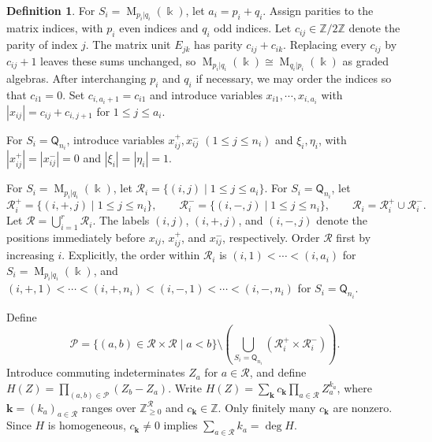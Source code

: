 \documentclass[11pt,reqno]{amsart}
\newcommand{\kk}{\Bbbk}
\newcommand{\Mat}{\operatorname{M}}
\newcommand{\Ztwo}{\mathbb Z/2\mathbb Z}
\newcommand{\Qtype}{\mathsf Q}
\theoremstyle{definition}
\newtheorem{definition}[theorem]{Definition}
\theoremstyle{remark}
\numberwithin{equation}{section}
\begin{document}
\begin{definition}\label{def:separator-data}
For $S_i=\Mat_{p_i|q_i}(\kk)$, let $a_i=p_i+q_i$.
Assign parities to the matrix indices, with $p_i$ even indices
and $q_i$ odd indices. Let $c_{ij}\in\Ztwo$ denote the parity
of index $j$.
The matrix unit $E_{jk}$ has parity $c_{ij}+c_{ik}$.
Replacing every $c_{ij}$ by $c_{ij}+1$ leaves these
sums unchanged, so
$\Mat_{p_i|q_i}(\kk)\cong\Mat_{q_i|p_i}(\kk)$
as graded algebras.
After interchanging $p_i$ and $q_i$ if necessary,
we may order the indices so that $c_{i1}=0$.
Set $c_{i,a_i+1}=c_{i1}$ and introduce variables
$x_{i1},\cdots,x_{i,a_i}$ with
$
|x_{ij}|=c_{ij}+c_{i,j+1}$
for $1\leq j\leq a_i$.

For $S_i=\Qtype_{n_i}$, introduce variables
$x^+_{ij},x^-_{ij}$ $(1\leq j\leq n_i)$ and
$\xi_i,\eta_i$, with
$
|x^+_{ij}|=|x^-_{ij}|=0$ and $
|\xi_i|=|\eta_i|=1$.

For $S_i=\Mat_{p_i|q_i}(\kk)$, let
$\mathcal R_i=\{(i,j)\mid 1\leq j\leq a_i\}$.
For $S_i=\Qtype_{n_i}$, let
\[
\mathcal R_i^+=\{(i,+,j)\mid 1\leq j\leq n_i\},
\qquad
\mathcal R_i^-=\{(i,-,j)\mid 1\leq j\leq n_i\},
\qquad
\mathcal R_i=\mathcal R_i^+\cup\mathcal R_i^-.
\]
Let $\mathcal R=\bigcup_{i=1}^r\mathcal R_i$.
The labels $(i,j)$, $(i,+,j)$, and $(i,-,j)$ denote
the positions immediately before $x_{ij}$, $x^+_{ij}$,
and $x^-_{ij}$, respectively.
Order $\mathcal R$ first by increasing $i$.
Explicitly, the order within $\mathcal R_i$ is $
(i,1)<\cdots<(i,a_i)$
for $S_i=\Mat_{p_i|q_i}(\kk)$, and
$
(i,+,1)<\cdots<(i,+,n_i)
<(i,-,1)<\cdots<(i,-,n_i)
$
for $S_i=\Qtype_{n_i}$.

Define
\[
\mathcal P
=
\{(a,b)\in\mathcal R\times\mathcal R\mid a<b\}
\setminus
\left(
\bigcup_{S_i=\Qtype_{n_i}}
(\mathcal R_i^+\times\mathcal R_i^-)
\right).
\]
Introduce commuting indeterminates $Z_a$ for $a\in\mathcal R$,
and define
$
H(Z)=\prod_{(a,b)\in\mathcal P}(Z_b-Z_a)$.
Write
$
H(Z)=\sum_{\mathbf k}
c_{\mathbf k}\prod_{a\in\mathcal R}Z_a^{k_a}$,
where $\mathbf k=(k_a)_{a\in\mathcal R}$ ranges over
$\mathbb Z_{\geq0}^{\mathcal R}$ and $c_{\mathbf k}\in\mathbb Z$.
Only finitely many $c_{\mathbf k}$ are nonzero.
Since $H$ is homogeneous, $c_{\mathbf k}\ne0$ implies
$\sum_{a\in\mathcal R}k_a=\deg H$.

\end{definition}
\end{document}
